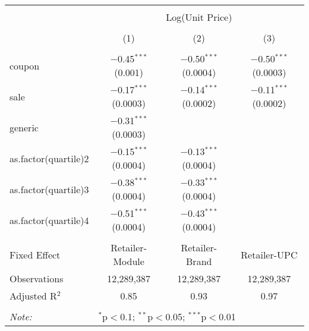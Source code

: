 
\begin{table}[!htbp] \centering 
  \caption{} 
  \label{tab:overallSavingsNonStorable} 
\begin{tabular}{@{\extracolsep{5pt}}lccc} 
\\[-1.8ex]\hline 
\hline \\[-1.8ex] 
 & \multicolumn{3}{c}{Log(Unit Price)} \\ 
\\[-1.8ex] & (1) & (2) & (3)\\ 
\hline \\[-1.8ex] 
 coupon & $-$0.45$^{***}$ (0.001) & $-$0.50$^{***}$ (0.0004) & $-$0.50$^{***}$ (0.0003) \\ 
  sale & $-$0.17$^{***}$ (0.0003) & $-$0.14$^{***}$ (0.0002) & $-$0.11$^{***}$ (0.0002) \\ 
  generic & $-$0.31$^{***}$ (0.0003) &  &  \\ 
  as.factor(quartile)2 & $-$0.15$^{***}$ (0.0004) & $-$0.13$^{***}$ (0.0004) &  \\ 
  as.factor(quartile)3 & $-$0.38$^{***}$ (0.0004) & $-$0.33$^{***}$ (0.0004) &  \\ 
  as.factor(quartile)4 & $-$0.51$^{***}$ (0.0004) & $-$0.43$^{***}$ (0.0004) &  \\ 
 \hline \\[-1.8ex] 
Fixed Effect & Retailer-Module & Retailer-Brand & Retailer-UPC \\ 
Observations & 12,289,387 & 12,289,387 & 12,289,387 \\ 
Adjusted R$^{2}$ & 0.85 & 0.93 & 0.97 \\ 
\hline 
\hline \\[-1.8ex] 
\textit{Note:}  & \multicolumn{3}{l}{$^{*}$p$<$0.1; $^{**}$p$<$0.05; $^{***}$p$<$0.01} \\ 
\end{tabular} 
\end{table} 
